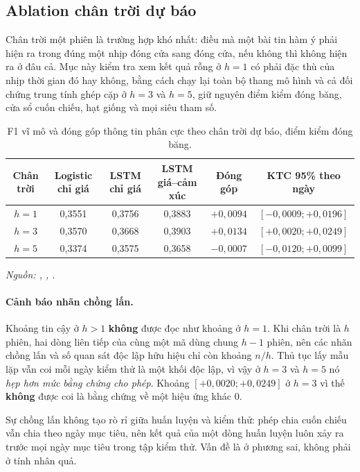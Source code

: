 \subsection{Ablation chân trời dự báo}
\label{sec:kq-horizon}

Chân trời một phiên là trường hợp khó nhất: điều mà một bài tin hàm ý phải hiện ra trong
đúng một nhịp đóng cửa sang đóng cửa, nếu không thì không hiện ra ở đâu cả. Mục này kiểm
tra xem kết quả rỗng ở $h = 1$ có phải đặc thù của nhịp thời gian đó hay không, bằng cách
chạy lại toàn bộ thang mô hình và cả đối chứng trung tính ghép cặp ở $h = 3$ và $h = 5$,
giữ nguyên điểm kiểm đóng băng, cửa sổ cuốn chiếu, hạt giống và mọi siêu tham số.

\begin{table}[H]
  \centering
  \caption{F1 vĩ mô và đóng góp thông tin phân cực theo chân trời dự báo, điểm kiểm đóng băng.}
  \label{tab:kq-horizon}
  \begin{tabular}{c c c c c c}
    \toprule
    Chân trời & Logistic chỉ giá & LSTM chỉ giá & LSTM giá--cảm xúc & Đóng góp & KTC 95\% theo ngày \\
    \midrule
    $h = 1$ & 0,3551 & 0,3756 & 0,3883 & $+0{,}0094$ & $[-0{,}0009; +0{,}0196]$ \\
    $h = 3$ & 0,3570 & 0,3668 & 0,3903 & $+0{,}0134$ & $[+0{,}0020; +0{,}0249]$ \\
    $h = 5$ & 0,3374 & 0,3575 & 0,3658 & $-0{,}0007$ & $[-0{,}0120; +0{,}0099]$ \\
    \bottomrule
  \end{tabular}
\noindent\textit{Nguồn: , , .}
\end{table}

\paragraph{Cảnh báo nhãn chồng lấn.}
Khoảng tin cậy ở $h > 1$ \textbf{không} được đọc như khoảng ở $h = 1$. Khi chân trời là
$h$ phiên, hai dòng liên tiếp của cùng một mã dùng chung $h - 1$ phiên, nên các nhãn chồng
lấn và số quan sát độc lập hữu hiệu chỉ còn khoảng $n/h$. Thủ tục lấy mẫu lặp vẫn coi mỗi
ngày kiểm thử là một khối độc lập, vì vậy ở $h = 3$ và $h = 5$ nó \emph{hẹp hơn mức bằng
chứng cho phép}. Khoảng $[+0{,}0020; +0{,}0249]$ ở $h = 3$ vì thế \textbf{không} được coi
là bằng chứng về một hiệu ứng khác 0.

Sự chồng lấn không tạo rò rỉ giữa huấn luyện và kiểm thử: phép chia cuốn chiếu vẫn chia
theo ngày mục tiêu, nên kết quả của một dòng huấn luyện luôn xảy ra trước mọi ngày mục
tiêu trong tập kiểm thử. Vấn đề là ở phương sai, không phải ở tính nhân quả.


